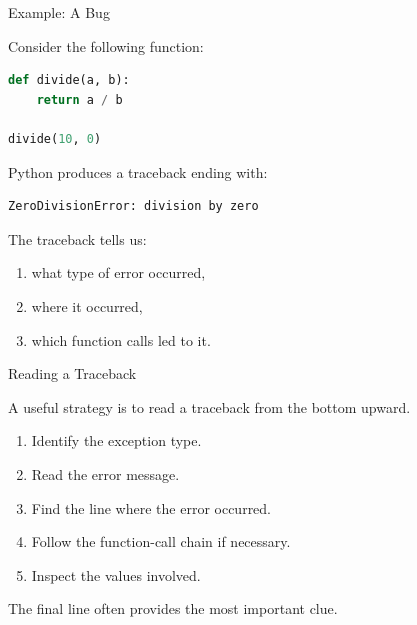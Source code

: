 \documentclass[aspectratio=43]{beamer}
\begin{document}
\begin{frame}[fragile]{Example: A Bug}

Consider the following function:

\begin{lstlisting}[language=Python]
def divide(a, b):
    return a / b

divide(10, 0)
\end{lstlisting}

Python produces a traceback ending with:

\begin{lstlisting}
ZeroDivisionError: division by zero
\end{lstlisting}

The traceback tells us:

\begin{enumerate}
  \item what type of error occurred,
  \item where it occurred,
  \item which function calls led to it.
\end{enumerate}

\end{frame}

\begin{frame}{Reading a Traceback}

A useful strategy is to read a traceback from the bottom upward.

\begin{enumerate}
  \item Identify the exception type.
  \item Read the error message.
  \item Find the line where the error occurred.
  \item Follow the function-call chain if necessary.
  \item Inspect the values involved.
\end{enumerate}

\vspace{0.3cm}

The final line often provides the most important clue.

\end{frame}
\end{document}
